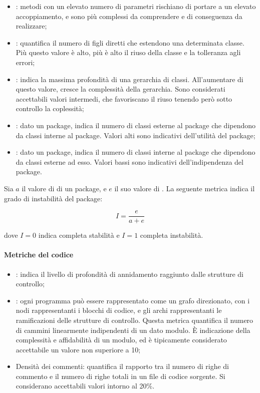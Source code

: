 \begin{itemize}
  \item {}: metodi con un elevato numero di parametri
    rischiano di portare a un elevato accoppiamento, e sono più complessi da
    comprendere e di conseguenza da realizzare;
  \item {}: quantifica il numero di figli diretti
    che estendono una determinata classe. Più questo valore è alto, più è alto il
    riuso della classe e la tolleranza agli errori;
  \item {}: indica la massima profondità
    di una gerarchia di classi. All'aumentare di questo valore, cresce la
    complessità della gerarchia. Sono considerati accettabili valori intermedi,
    che favoriscano il riuso tenendo però sotto controllo la coplessità;
  \item {}: dato un package, indica il numero
    di classi esterne al package che dipendono da classi interne al package.
    Valori alti sono indicativi dell'utilità del package;
  \item {}: dato un package, indica il numero
    di classi interne al package che dipendono da classi esterne ad esso. Valori
    bassi sono indicativi dell'indipendenza del package.
\end{itemize}

Sia $a$ il valore di  di un package, e $e$ il suo
valore di . La seguente metrica indica il grado di
instabilità del package:

\[
    I = \frac{e}{a + e}
\]

dove $I = 0$ indica completa stabilità e $I = 1$ completa instabilità.

\paragraph{Metriche del codice}
\label{par:metriche_del_codice}

\begin{itemize}
  \item {}: indica il livello di profondità di
    annidamento raggiunto dalle strutture di controllo;
  \item {}: ogni programma può essere
    rappresentato come un grafo direzionato, con i nodi rappresentanti i blocchi
    di codice, e gli archi rappresentanti le ramificazioni delle strutture di
    controllo. Questa metrica quantifica il numero di cammini linearmente
    indipendenti di un dato modulo. \`E indicazione della complessità e
    affidabilità di un modulo, ed è tipicamente considerato accettabile un
    valore non superiore a 10;
  \item{Densità dei commenti}: quantifica il rapporto tra il numero di righe di
    commento e il numero di righe totali in un file di codice sorgente. Si
    considerano accettabili valori intorno al 20\%.
\end{itemize}

